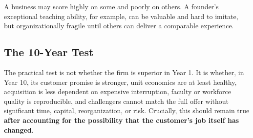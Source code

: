 A business may score highly on some and poorly on others. A founder's exceptional teaching ability, for example, can be valuable and hard to imitate, but organizationally fragile until others can deliver a comparable experience.

\subsection{The 10-Year Test}
\label{sec:ten_year_test}

The practical test is not whether the firm is superior in Year 1. It is whether, in Year 10, its customer promise is stronger, unit economics are at least healthy, acquisition is less dependent on expensive interruption, faculty or workforce quality is reproducible, and challengers cannot match the full offer without significant time, capital, reorganization, or risk. Crucially, this should remain true \textbf{after accounting for the possibility that the customer's job itself has changed}.
